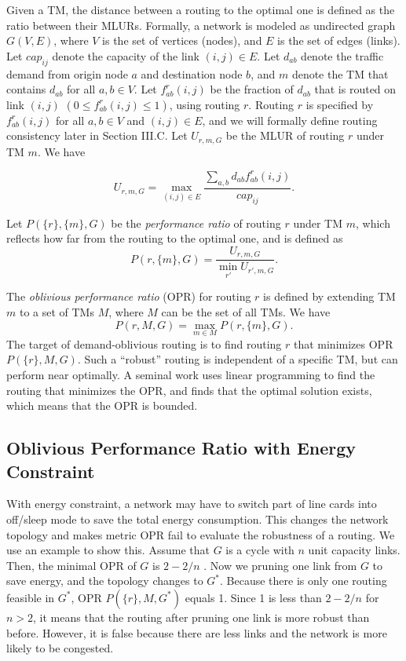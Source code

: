 \documentclass[conference]{IEEEtran}
\begin{document}
Given a TM, the distance between a routing to the optimal one is defined as the ratio between their MLURs. Formally, a network is modeled as undirected graph $G(V, E)$, where $V$ is the set of vertices (nodes), and $E$ is the set of edges (links). Let $cap_{ij}$ denote the capacity of the link $(i, j) \in E$. Let $d_{ab}$ denote the traffic demand from origin node $a$ and destination node $b$, and $m$ denote the TM that contains $d_{ab}$ for all $a, b \in V$. Let $f^r_{ab}(i,j)$ be the fraction of $d_{ab}$ that is routed on link $(i, j)$ $(0 \leq f^r_{ab}(i,j) \leq 1)$, using routing $r$. Routing $r$ is specified by $f^r_{ab}(i,j)$ for all $a, b \in V$ and $(i, j) \in E$, and we will formally define routing consistency later in Section III.C. Let $U_{r, m, G}$ be the MLUR of routing $r$ under TM $m$. We have

\begin{equation}
\label{equation_U_rmG}
	U_{r, m, G} = \max_{(i,j)\in E} \frac{\sum_{a,b} d_{ab}f^r_{ab}(i,j)}{cap_{ij}}.
\end{equation}

Let $P(\{ r \},\{ m \}, G)$ be the \emph{performance ratio} of routing $r$ under TM $m$, which reflects how far from the routing to the optimal one, and is defined as
\begin{equation}
\label{equation_P_rmG}
	P(r,\{ m \}, G) = \frac{U_{r,m,G}}{\min_{r'} U_{r', m, G}}.
\end{equation}

The \emph{oblivious performance ratio} (OPR) for routing $r$ is defined by extending TM $m$ to a set of TMs $M$, where $M$ can be the set of all TMs. We have
\begin{equation}
\label{equation_P_rMG}
	P(r, M, G) = \max_{m\in M} P(r, \{ m \}, G).
\end{equation}
The target of demand-oblivious routing is to find routing $r$ that minimizes OPR $P(\{ r \}, M, G)$. Such a ``robust'' routing is independent of a specific TM, but can perform near optimally. A seminal work \cite{networking:oblivious} uses linear programming to find the routing that minimizes the OPR, and finds that the optimal solution exists, which means that the OPR is bounded.

\subsection{Oblivious Performance Ratio with Energy Constraint}

With energy constraint, a network may have to switch part of line cards into off/sleep mode to save the total energy consumption. This changes the network topology and makes metric OPR fail to evaluate the robustness of a routing. We use an example to show this. Assume that $G$ is a cycle with $n$ unit capacity links. Then, the minimal OPR of $G$ is $2-2/n$ \cite{networking:oblivious}. Now we pruning one link from $G$ to save energy, and the topology changes to $G^*$. Because there is only one routing feasible in $G^*$, OPR $P(\{ r \}, M, G^*)$ equals 1. Since 1 is less than $2-2/n$ for $n > 2$, it means that the routing after pruning one link is more robust than before. However, it is false because there are less links and the network is more likely to be congested.
\end{document}
